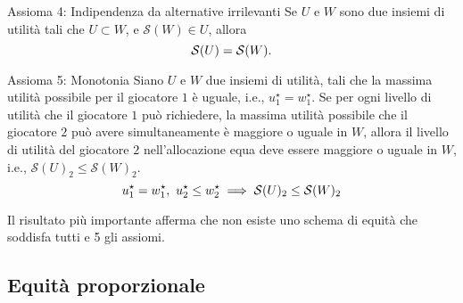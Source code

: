 \documentclass{beamer}
\begin{document}
\begin{frame}
	\begin{exampleblock}{Assioma 4: Indipendenza da alternative irrilevanti} \label{ax4}
		Se $U$ e $W$ sono due insiemi di utilità tali che $U \subset W$, e $\mathcal{S}(W) \in U$, allora
		\vspace{-0.2cm}
		\begin{equation}
			\mathcal{S}(U) = \mathcal{S}(W).
			\vspace{-0.2cm}
		\end{equation}
	\end{exampleblock}
	\begin{exampleblock}{Assioma 5: Monotonia} \label{ax5}
		Siano $U$ e $W$ due insiemi di utilità, tali che la massima utilità possibile per il giocatore $1$ è uguale, i.e., $u_1^\star = w_1^{\star}$. Se per ogni livello di utilità che il giocatore $1$ può richiedere, la massima utilità possibile che il giocatore $2$ può avere simultaneamente è maggiore o uguale in $W$, allora il livello di utilità del giocatore $2$ nell'allocazione equa deve essere maggiore o uguale in $W$, i.e., $\mathcal{S}(U)_2 \le \mathcal{S}(W)_2$.
		\vspace{-0.3cm}
		\begin{equation}
			u_1^\star = w_1^{\star}, \ u_2^\star \le w_2^{\star} \implies \mathcal{S}(U)_2 \le \mathcal{S}(W)_2
			\vspace{-0.3cm}
		\end{equation}

	\end{exampleblock}
\end{frame}

\begin{frame}
	\begin{alertblock}{}
		Il risultato più importante afferma che non esiste uno schema di equità che soddisfa tutti e 5 gli assiomi. 
	\end{alertblock}
\end{frame}

\subsection{Equità proporzionale}
\end{document}
